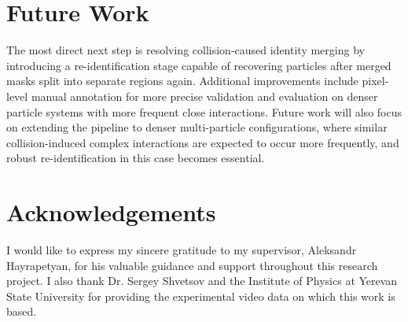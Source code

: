 \documentclass[conference]{IEEEtran}
\begin{document}
\section{Future Work}

The most direct next step is resolving collision-caused identity merging by introducing a re-identification stage capable of recovering particles after merged masks split into separate regions again. Additional improvements include pixel-level manual annotation for more precise validation and evaluation on denser particle systems with more frequent close interactions. Future work will also focus on extending the pipeline to denser multi-particle configurations, where similar collision-induced complex interactions are expected to occur more frequently, and robust re-identification in this case becomes essential.

\section*{Acknowledgements}

I would like to express my sincere gratitude to my supervisor, Aleksandr Hayrapetyan, for his valuable guidance and support throughout this research project. I also thank Dr. Sergey Shvetsov and the Institute of Physics at Yerevan State University for providing the experimental video data on which this work is based.



\end{document}
